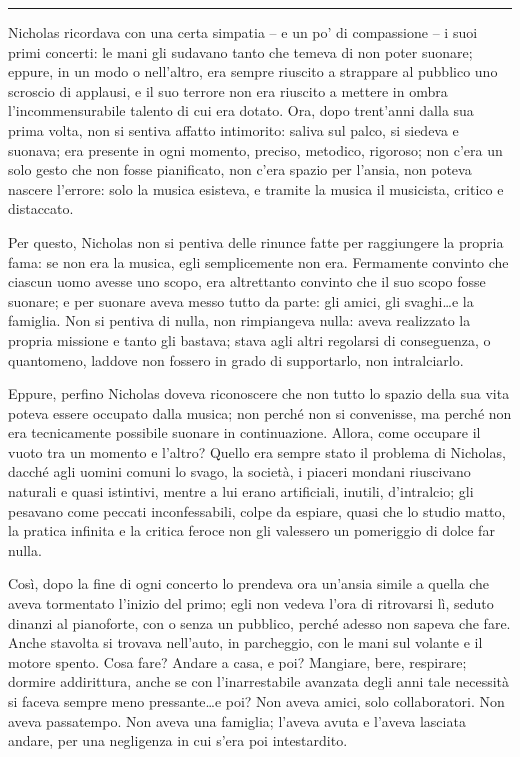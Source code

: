\documentclass[a4paper,oneside,11pt]{memoir}
\begin{document}
\plainbreak{1}

Nicholas ricordava con una certa simpatia -- e un po' di compassione -- i suoi
primi concerti: le mani gli sudavano tanto che temeva di non poter suonare;
eppure, in un modo o nell'altro, era sempre riuscito a strappare al pubblico uno
scroscio di applausi, e il suo terrore non era riuscito a mettere in ombra
l'incommensurabile talento di cui era dotato. Ora, dopo trent'anni dalla sua
prima volta, non si sentiva affatto intimorito: saliva sul palco, si siedeva e
suonava; era presente in ogni momento, preciso, metodico, rigoroso; non c'era un
solo gesto che non fosse pianificato, non c'era spazio per l'ansia, non poteva
nascere l'errore: solo la musica esisteva, e tramite la musica il musicista,
critico e distaccato.

Per questo, Nicholas non si pentiva delle rinunce fatte per raggiungere la
propria fama: se non era la musica, egli semplicemente non era. Fermamente
convinto che ciascun uomo avesse uno scopo, era altrettanto convinto che il suo
scopo fosse suonare; e per suonare aveva messo tutto da parte: gli amici, gli
svaghi\dots e la famiglia. Non si pentiva di nulla, non rimpiangeva nulla: aveva
realizzato la propria missione e tanto gli bastava; stava agli altri regolarsi
di conseguenza, o quantomeno, laddove non fossero in grado di supportarlo, non
intralciarlo.

Eppure, perfino Nicholas doveva riconoscere che non tutto lo spazio della sua
vita poteva essere occupato dalla musica; non perché non si convenisse, ma
perché non era tecnicamente possibile suonare in continuazione. Allora, come
occupare il vuoto tra un momento e l'altro? Quello era sempre stato il problema
di Nicholas, dacché agli uomini comuni lo svago, la società, i piaceri mondani
riuscivano naturali e quasi istintivi, mentre a lui erano artificiali, inutili,
d'intralcio; gli pesavano come peccati inconfessabili, colpe da espiare, quasi
che lo studio matto, la pratica infinita e la critica feroce non gli valessero
un pomeriggio di dolce far nulla.

Così, dopo la fine di ogni concerto lo prendeva ora un'ansia simile a quella che
aveva tormentato l'inizio del primo; egli non vedeva l'ora di ritrovarsi lì,
seduto dinanzi al pianoforte, con o senza un pubblico, perché adesso non sapeva
che fare. Anche stavolta si trovava nell'auto, in parcheggio, con le mani sul
volante e il motore spento. Cosa fare? Andare a casa, e poi? Mangiare, bere,
respirare; dormire addirittura, anche se con l'inarrestabile avanzata degli anni
tale necessità si faceva sempre meno pressante\dots e poi? Non aveva amici, solo
collaboratori. Non aveva passatempo. Non aveva una famiglia; l'aveva avuta e
l'aveva lasciata andare, per una negligenza in cui s'era poi intestardito.
\end{document}
